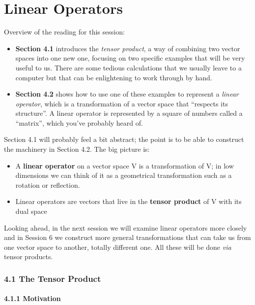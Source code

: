 \documentclass[oneside,english]{amsbook}
\numberwithin{section}{chapter}
\theoremstyle{plain}
\theoremstyle{definition}
\begin{document}
\chapter{Linear Operators}\label{linear-operators}

Overview of the reading for this session:

\begin{itemize}
	\item
	\textbf{Section 4.1} introduces the \emph{tensor product}, a way of
	combining two vector spaces into one new one, focusing on two specific
	examples that will be very useful to us. There are some tedious
	calculations that we usually leave to a computer but that can be
	enlightening to work through by hand.
	\item
	\textbf{Section 4.2} shows how to use one of these examples to
	represent a \emph{linear operator}, which is a transformation of a
	vector space that ``respects its structure''. A linear operator is
	represented by a square of numbers called a ``matrix'', which you've
	probably heard of.
\end{itemize}

Section 4.1 will probably feel a bit abstract; the point is to be able
to construct the machinery in Section 4.2. The big picture is:

\begin{itemize}
	\item
	A \textbf{linear operator} on a vector space V is a transformation of
	V; in low dimensions we can think of it as a geometrical
	transformation such as a rotation or reflection.
	\item
	Linear operators are vectors that live in the \textbf{tensor product}
	of V with its dual space
\end{itemize}

Looking ahead, in the next session we will examine linear operators more
closely and in Session 6 we construct more general transformations that
can take us from one vector space to another, totally different one. All
these will be done \emph{via} tensor products.

\subsection{4.1 The Tensor Product}\label{the-tensor-product}

\subsubsection{4.1.1 Motivation}\label{motivation}
\end{document}
